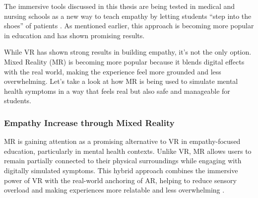 
The immersive tools discussed in this thesis are being tested in medical and nursing schools as a new way to teach empathy by letting students “step into the shoes” of patients \cite{Alieldin2024}. As mentioned earlier, this approach is becoming more popular in education and has shown promising results.

While VR has shown strong results in building empathy, it’s not the only option. Mixed Reality (MR) is becoming more popular because it blends digital effects with the real world, making the experience feel more grounded and less overwhelming. Let’s take a look at how MR is being used to simulate mental health symptoms in a way that feels real but also safe and manageable for students.

\subsubsection{Empathy Increase through Mixed Reality}

MR is gaining attention as a promising alternative to VR in empathy-focused education, particularly in mental health contexts. Unlike VR, MR allows users to remain partially connected to their physical surroundings while engaging with digitally simulated symptoms. This hybrid approach combines the immersive power of VR with the real-world anchoring of AR, helping to reduce sensory overload and making experiences more relatable and less overwhelming \cite{Zare-Bidaki2022}.

